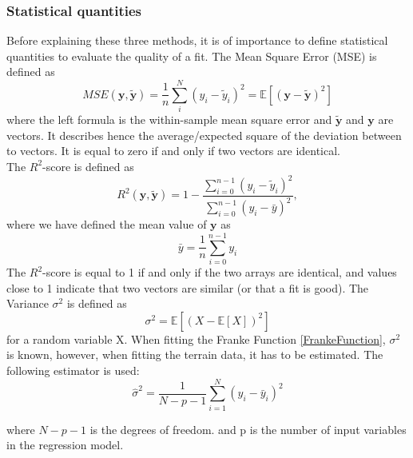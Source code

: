 \documentclass[11pt,a4paper,titlepage]{article}
\begin{document}
\subsubsection{Statistical quantities}
Before explaining these three methods, it is of importance to define statistical quantities to evaluate the quality of a fit.
The Mean Square Error (MSE) is defined as 
\begin{equation}\label{MSE}
MSE(\bm{y},\bm{\tilde y})=\frac{1}{n}\sum_i^N\left(y_i - \tilde y_i \right)^2=\mathbb{E}\left[(\bm{y}-\bm{\tilde y})^2  \right]
\end{equation}
where the left formula is the within-sample mean square error and $\bm{\tilde y}$ and $\bm{y}$ are vectors. It describes hence the average/expected square of the deviation between to vectors. It is equal to zero if and only if two vectors are identical.\\
The $R^2$-score is defined as 
\begin{equation}\label{R2}
R^2(\bm{y}, \bm{\tilde y}) = 1 - \frac{\sum_{i=0}^{n - 1} (y_i - \tilde{y}_i)^2}{\sum_{i=0}^{n - 1} (y_i - \bar{y})^2},
\end{equation}
where we have defined the mean value  of $\bm{y}$ as
\[
\bar{y} =  \frac{1}{n} \sum_{i=0}^{n - 1} y_i
\]
The $R^2$-score is equal to 1 if and only if the two arrays are identical, and values close to 1 indicate that two vectors are similar (or that a fit is good). 
The Variance $\sigma^2$ is defined as 
\begin{equation}\label{variance}
\sigma^2=\mathbb{E}\left[(X-\mathbb{E}\left[X\right])^2\right]
\end{equation}
for a random variable X. When fitting the Franke Function \ref{FrankeFunction}, $\sigma^2$ is known, however, when fitting the terrain data, it has to be estimated. The following estimator is used:
\begin{equation}\label{variance_estimate}
\hat\sigma^2 = \frac{1}{N-p-1}\sum\limits_{i=1}^N(y_i-\bar{y}_i)^2
\end{equation}

where $N-p-1$ is the degrees of freedom. and p is the number of input variables in the regression model.
\end{document}
